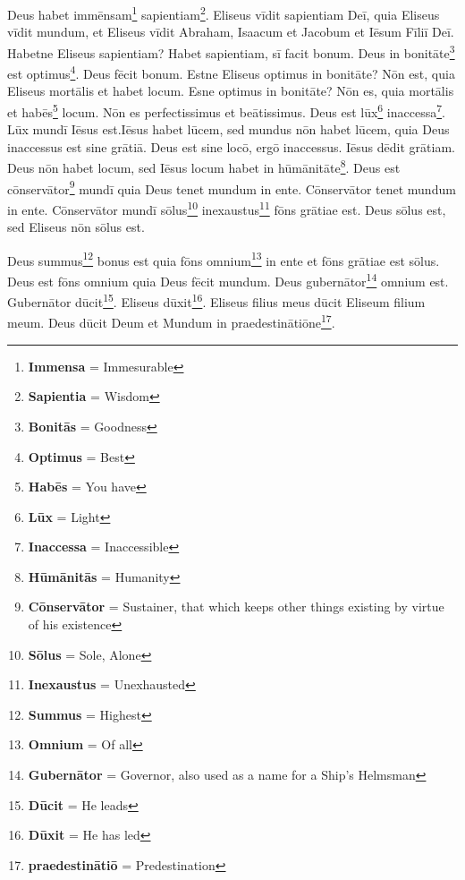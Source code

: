 Deus habet immēnsam\footnote{\textbf{Immensa} = Immesurable} sapientiam\footnote{\textbf{Sapientia} = Wisdom}. Eliseus vīdit sapientiam Deī, quia Eliseus vīdit mundum, et Eliseus vīdit Abraham, Isaacum et Jacobum et Iēsum Fīliī Deī. Habetne Eliseus sapientiam? Habet sapientiam, sī facit bonum. Deus in bonitāte\footnote{\textbf{Bonitās} = Goodness} est optimus\footnote{\textbf{Optimus} = Best}. Deus fēcit bonum.  Estne Eliseus optimus in bonitāte? Nōn est, quia Eliseus mortālis et habet locum. Esne optimus in bonitāte? Nōn es, quia mortālis et habēs\footnote{\textbf{Habēs} = You have} locum. Nōn es perfectissimus et beātissimus. Deus est lūx\footnote{\textbf{Lūx} = Light} inaccessa\footnote{\textbf{Inaccessa} = Inaccessible}. Lūx mundī Iēsus est.Iēsus habet lūcem, sed mundus nōn habet lūcem, quia Deus inaccessus est sine grātiā. Deus est sine locō, ergō inaccessus. Iēsus dēdit grātiam. Deus nōn habet locum, sed Iēsus locum habet in hūmānitāte\footnote{\textbf{Hūmānitās} = Humanity}. Deus est cōnservātor\footnote{\textbf{Cōnservātor} = Sustainer, that which keeps other things existing by virtue of his existence} mundī quia Deus tenet mundum in ente. Cōnservātor tenet mundum in ente. Cōnservātor mundī sōlus\footnote{\textbf{Sōlus} = Sole, Alone} inexaustus\footnote{\textbf{Inexaustus} = Unexhausted} fōns grātiae est. Deus sōlus est, sed Eliseus nōn sōlus est. 
\par
Deus summus\footnote{\textbf{Summus} = Highest} bonus est quia fōns omnium\footnote{\textbf{Omnium} = Of all} in ente et fōns grātiae est sōlus. Deus est fōns omnium quia Deus fēcit mundum. Deus gubernātor\footnote{\textbf{Gubernātor} = Governor, also used as a name for a Ship's Helmsman} omnium est. Gubernātor dūcit\footnote{\textbf{Dūcit} = He leads}. Eliseus dūxit\footnote{\textbf{Dūxit} = He has led}. Eliseus filius meus dūcit Eliseum filium meum. Deus dūcit Deum et Mundum in praedestinātiōne\footnote{\textbf{praedestinātiō} = Predestination}.  